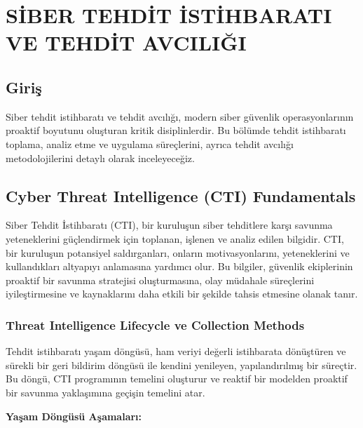 \chapter{SİBER TEHDİT İSTİHBARATI VE TEHDİT AVCILIĞI}

\section*{Giriş}
Siber tehdit istihbaratı ve tehdit avcılığı, modern siber güvenlik operasyonlarının proaktif boyutunu oluşturan kritik disiplinlerdir. Bu bölümde tehdit istihbaratı toplama, analiz etme ve uygulama süreçlerini, ayrıca tehdit avcılığı metodolojilerini detaylı olarak inceleyeceğiz.

\section{Cyber Threat Intelligence (CTI) Fundamentals}
Siber Tehdit İstihbaratı (CTI), bir kuruluşun siber tehditlere karşı savunma yeteneklerini güçlendirmek için toplanan, işlenen ve analiz edilen bilgidir. CTI, bir kuruluşun potansiyel saldırganları, onların motivasyonlarını, yeteneklerini ve kullandıkları altyapıyı anlamasına yardımcı olur. Bu bilgiler, güvenlik ekiplerinin proaktif bir savunma stratejisi oluşturmasına, olay müdahale süreçlerini iyileştirmesine ve kaynaklarını daha etkili bir şekilde tahsis etmesine olanak tanır.

\subsection{Threat Intelligence Lifecycle ve Collection Methods}

Tehdit istihbaratı yaşam döngüsü, ham veriyi değerli istihbarata dönüştüren ve sürekli bir geri bildirim döngüsü ile kendini yenileyen, yapılandırılmış bir süreçtir. Bu döngü, CTI programının temelini oluşturur ve reaktif bir modelden proaktif bir savunma yaklaşımına geçişin temelini atar.

\textbf{Yaşam Döngüsü Aşamaları:}

